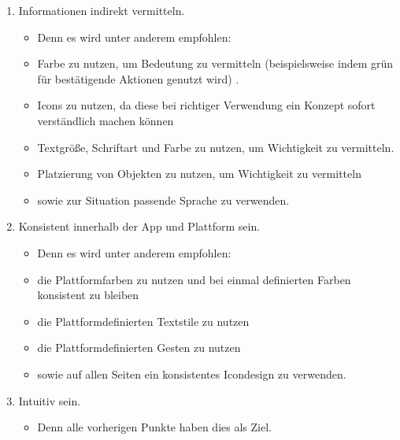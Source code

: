 \begin{enumerate}
	\item Informationen indirekt vermitteln.%
	\begin{itemize}%
		\item[] Denn es wird unter anderem empfohlen:%
		\item Farbe zu nutzen, um Bedeutung zu vermitteln (beispielsweise indem grün für bestätigende Aktionen genutzt wird) \cite{konventionen_foundations_color}.
		\item Icons zu nutzen, da diese bei richtiger Verwendung ein Konzept sofort verständlich machen können\cite{konventionen_foundations_icons} 
		\item Textgröße, Schriftart und Farbe zu nutzen, um Wichtigkeit zu vermitteln\cite{konventionen_foundations_typography}.
		\item Platzierung von Objekten zu nutzen, um Wichtigkeit zu vermitteln\cite{konventionen_foundations_layout}
		\item sowie zur Situation passende Sprache zu verwenden\cite{konventionen_foundations_writing}.
	\end{itemize}
	
	\item Konsistent innerhalb der App und Plattform sein.%
	\begin{itemize}%
		\item[] Denn es wird unter anderem empfohlen:%
		\item die Plattformfarben zu nutzen und bei einmal definierten Farben konsistent zu bleiben\cite{konventionen_foundations_color}
		\item die Plattformdefinierten Textstile zu nutzen\cite{konventionen_foundations_typography}
		\item die Plattformdefinierten Gesten zu nutzen\cite{konventionen_foundations_accessibility} 
		\item sowie auf allen Seiten ein konsistentes Icondesign zu verwenden\cite{konventionen_foundations_icons}.
	\end{itemize}
	
	
	\item Intuitiv sein.%
	\begin{itemize}
		\item Denn alle vorherigen Punkte haben dies als Ziel.
	\end{itemize}
	

\end{enumerate}

